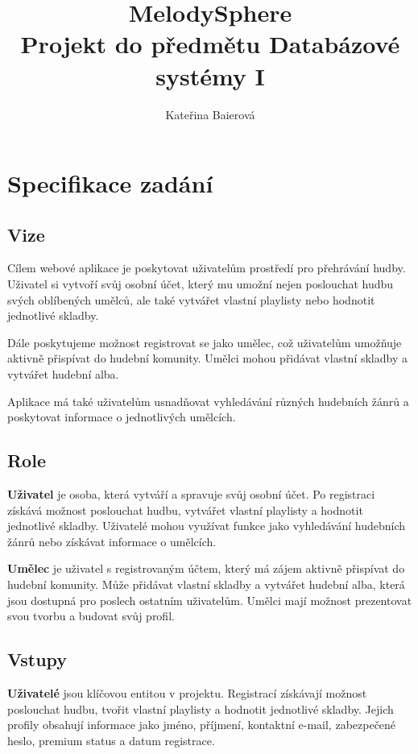 \documentclass[czech,12pt,a4paper,titlepage]{article}
\title{%
    \textbf {MelodySphere} \\
    \bigskip
    \large Projekt do předmětu Databázové systémy I}
\author{Kateřina Baierová}
\date{}
\begin{document}
    \graphicspath{ {./img/} }

    \begin{titlepage}
        \maketitle
        \thispagestyle{empty}
    \end{titlepage}

    \tableofcontents

    \clearpage


    \section{Specifikace zadání}\label{sec:specifikace-zadani}
    \subsection*{Vize}
    Cílem webové aplikace je poskytovat uživatelům prostředí pro přehrávání hudby.
    Uživatel si vytvoří svůj osobní účet, který mu umožní nejen poslouchat
    hudbu svých oblíbených umělců, ale také vytvářet
    vlastní playlisty nebo hodnotit jednotlivé skladby.

    Dále poskytujeme možnost registrovat se jako umělec,
    což uživatelům umožňuje aktivně přispívat do hudební komunity.
    Umělci mohou přidávat vlastní skladby a vytvářet hudební alba.

    Aplikace má také uživatelům usnadňovat vyhledávání různých hudebních žánrů
    a poskytovat informace o jednotlivých umělcích.


    \subsection*{Role}
    \textbf{Uživatel} je osoba, která vytváří a spravuje svůj osobní účet.
    Po registraci získává možnost poslouchat hudbu, vytvářet vlastní playlisty
    a hodnotit jednotlivé skladby.
    Uživatelé mohou využívat funkce jako vyhledávání hudebních žánrů nebo
    získávat informace o umělcích.


    \textbf{Umělec} je uživatel s registrovaným účtem, který má zájem aktivně přispívat do hudební komunity.
    Může přidávat vlastní skladby a vytvářet hudební alba, která jsou dostupná pro poslech ostatním uživatelům.
    Umělci mají možnost prezentovat svou tvorbu a budovat svůj profil.

    \subsection*{Vstupy}
    \textbf{Uživatelé} jsou klíčovou entitou v projektu.
    Registrací získávají možnost poslouchat hudbu, tvořit vlastní playlisty a hodnotit jednotlivé skladby.
    Jejich profily obsahují informace jako jméno, příjmení, kontaktní e-mail, zabezpečené heslo, premium status a datum registrace.
\end{document}
